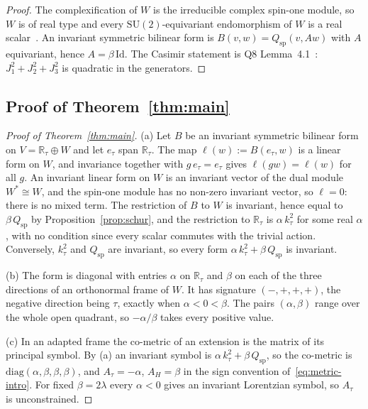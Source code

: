 \documentclass[12pt,a4paper]{article}
\newcommand{\SU}{\mathrm{SU}}
\newcommand{\Qsp}{Q_{\mathrm{sp}}}
\newcommand{\Rtau}{\mathbb{R}_\tau}
\begin{document}
      \begin{proof}
        The complexification of $W$ is the irreducible complex spin-one module, so $W$ is of real type and every
        $\SU(2)$-equivariant endomorphism of $W$ is a real scalar~\cite{BrockerTomDieck1985}.
        An invariant symmetric bilinear form is $B(v,w) = \Qsp(v, Aw)$ with $A$ equivariant, hence
        $A = \beta\,\mathrm{Id}$.
        The Casimir statement is Q8 Lemma~4.1~\cite{BeauQ8}: $J_1^2+J_2^2+J_3^2$ is quadratic in the generators.
      \end{proof}

    \subsection{Proof of Theorem~\ref{thm:main}}

      \begin{proof}[Proof of Theorem~\ref{thm:main}]
(a) Let $B$ be an invariant symmetric bilinear form on $V = \Rtau\oplus W$ and let $e_\tau$ span $\Rtau$.
The map $\ell(w) := B(e_\tau, w)$ is a linear form on $W$, and invariance together with $g\,e_\tau = e_\tau$ gives
$\ell(g w) = \ell(w)$ for all $g$.
An invariant linear form on $W$ is an invariant vector of the dual module $W^*\cong W$, and the spin-one
module has no non-zero invariant vector, so $\ell = 0$: there is no mixed term.
The restriction of $B$ to $W$ is invariant, hence equal to $\beta\,\Qsp$ by Proposition~\ref{prop:schur}, and the
restriction to $\Rtau$ is $\alpha\,k_\tau^2$ for some real $\alpha$, with no condition since every scalar commutes with
the trivial action.
Conversely, $k_\tau^2$ and $\Qsp$ are invariant, so every form $\alpha\,k_\tau^2 + \beta\,\Qsp$ is invariant.

(b) The form is diagonal with entries $\alpha$ on $\Rtau$ and $\beta$ on each of the three directions of an orthonormal
frame of $W$.
It has signature $(-,+,+,+)$, the negative direction being $\tau$, exactly when $\alpha<0<\beta$.
The pairs $(\alpha,\beta)$ range over the whole open quadrant, so $-\alpha/\beta$ takes every positive value.

(c) In an adapted frame the co-metric of an extension is the matrix of its principal symbol.
By (a) an invariant symbol is $\alpha\,k_\tau^2 + \beta\,\Qsp$, so the co-metric is
$\mathrm{diag}(\alpha,\beta,\beta,\beta)$, and $A_\tau = -\alpha$, $A_H = \beta$ in the sign convention
of~\eqref{eq:metric-intro}.
For fixed $\beta = 2\lambda$ every $\alpha<0$ gives an invariant Lorentzian symbol, so $A_\tau$ is unconstrained.
      \end{proof}
\end{document}
